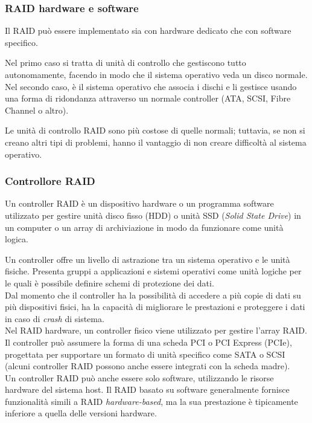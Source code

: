 \item
\subsubsection{RAID hardware e software}
Il RAID pu\`{o} essere implementato sia con hardware dedicato che con software specifico.

Nel primo caso si tratta di unit\`{a} di controllo che gestiscono tutto autonomamente, facendo in modo che il sistema operativo veda un disco normale. 
Nel secondo caso, \`{e} il sistema operativo che associa i dischi e li gestisce usando una forma di ridondanza attraverso un normale controller (ATA, SCSI, Fibre Channel o altro).

Le unit\`{a} di controllo RAID sono pi\`{u} costose di quelle normali; tuttavia, se non si creano altri tipi di problemi, hanno il vantaggio di non creare difficolt\`{a} al sistema operativo.\cite{etichetta9}

\item
\subsubsection{Controllore RAID}
Un controller RAID \`{e} un dispositivo hardware o un programma software utilizzato per gestire unit\`{a} disco fisso (HDD) o unit\`{a} SSD (\textit{Solid State Drive}) in un computer o un array di archiviazione in modo da funzionare come unit\`{a} logica.

Un controller offre un livello di astrazione tra un sistema operativo e le unit\`{a} fisiche. Presenta gruppi a applicazioni e sistemi operativi come unit\`{a} logiche per le quali \`{e} possibile definire schemi di protezione dei dati. \\
Dal momento che il controller ha la possibilit\`{a} di accedere a pi\`{u} copie di dati su pi\`{u} dispositivi fisici, ha la capacit\`{a} di migliorare le prestazioni e proteggere i dati in caso di \textit{crash} di sistema.\cite{etichetta12}\\

Nel RAID hardware, un controller fisico viene utilizzato per gestire l'array RAID. Il controller pu\`{o} assumere la forma di una scheda PCI o PCI Express (PCIe), progettata per supportare un formato di unit\`{a} specifico come SATA o SCSI (alcuni controller RAID possono anche essere integrati con la scheda madre). \\
Un controller RAID pu\`{o} anche essere solo software, utilizzando le risorse hardware del sistema host. Il RAID basato su software generalmente fornisce funzionalit\`{a} simili a RAID \textit{hardware-based}, ma la sua prestazione \`{e} tipicamente inferiore a quella delle versioni hardware.\cite{etichetta12}

